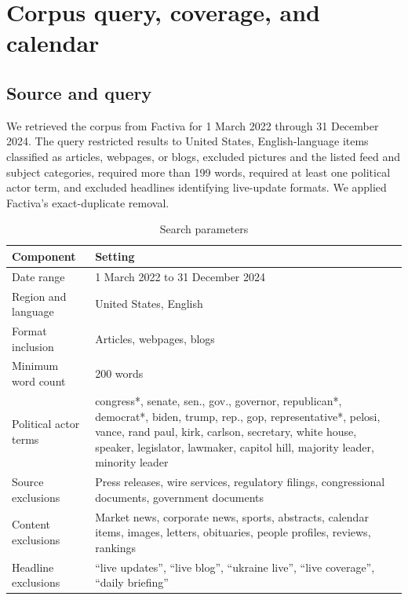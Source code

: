 \section{Corpus query, coverage, and calendar}

\subsection*{Source and query}

We retrieved the corpus from Factiva for 1 March 2022 through 31 December 2024. The query restricted results to United States, English-language items classified as articles, webpages, or blogs, excluded pictures and the listed feed and subject categories, required more than 199 words, required at least one political actor term, and excluded headlines identifying live-update formats. We applied Factiva's exact-duplicate removal.

\begin{table}[htbp]
\centering\small
\caption{Search parameters}
\begin{tabular}{@{}p{}p{}@{}}
\toprule
\textbf{Component} & \textbf{Setting} \\
\midrule
Date range & 1 March 2022 to 31 December 2024 \\
Region and language & United States, English \\
Format inclusion & Articles, webpages, blogs \\
Minimum word count & 200 words \\
Political actor terms & congress*, senate, sen., gov., governor, republican*, democrat*, biden, trump, rep., gop, representative*, pelosi, vance, rand paul, kirk, carlson, secretary, white house, speaker, legislator, lawmaker, capitol hill, majority leader, minority leader \\
Source exclusions & Press releases, wire services, regulatory filings, congressional documents, government documents \\
Content exclusions & Market news, corporate news, sports, abstracts, calendar items, images, letters, obituaries, people profiles, reviews, rankings \\
Headline exclusions & ``live updates'', ``live blog'', ``ukraine live'', ``live coverage'', ``daily briefing'' \\
\bottomrule
\end{tabular}
\end{table}

